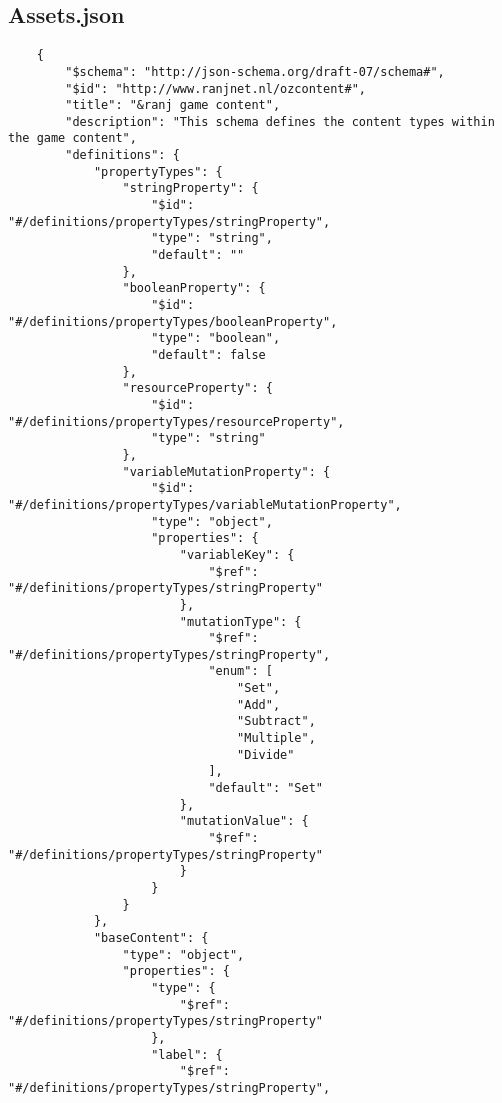 \begin{appendices}
    \chapter{Assets.json}    
    \label{app:assetsjson}
    \lstset{language=JSON}
    \begin{lstlisting}
    {
        "$schema": "http://json-schema.org/draft-07/schema#",
        "$id": "http://www.ranjnet.nl/ozcontent#",
        "title": "&ranj game content",
        "description": "This schema defines the content types within the game content",
        "definitions": {
            "propertyTypes": {
                "stringProperty": {
                    "$id": "#/definitions/propertyTypes/stringProperty",
                    "type": "string",
                    "default": ""
                },
                "booleanProperty": {
                    "$id": "#/definitions/propertyTypes/booleanProperty",
                    "type": "boolean",
                    "default": false
                },
                "resourceProperty": {
                    "$id": "#/definitions/propertyTypes/resourceProperty",
                    "type": "string"
                },
                "variableMutationProperty": {
                    "$id": "#/definitions/propertyTypes/variableMutationProperty",
                    "type": "object",
                    "properties": {
                        "variableKey": {
                            "$ref": "#/definitions/propertyTypes/stringProperty"
                        },
                        "mutationType": {
                            "$ref": "#/definitions/propertyTypes/stringProperty",
                            "enum": [
                                "Set",
                                "Add",
                                "Subtract",
                                "Multiple",
                                "Divide"
                            ],
                            "default": "Set"
                        },
                        "mutationValue": {
                            "$ref": "#/definitions/propertyTypes/stringProperty"
                        }
                    }
                }
            },
            "baseContent": {
                "type": "object",
                "properties": {
                    "type": {
                        "$ref": "#/definitions/propertyTypes/stringProperty"
                    },
                    "label": {
                        "$ref": "#/definitions/propertyTypes/stringProperty",

\end{lstlisting}
\end{appendices}
